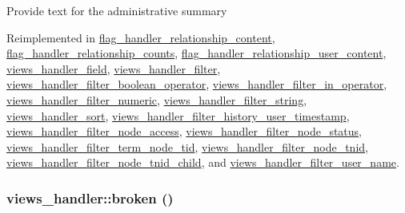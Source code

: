Provide text for the administrative summary 

Reimplemented in \hyperlink{classflag__handler__relationship__content_d5dd884b0fe1765d43a268baf16057ef}{flag\_\-handler\_\-relationship\_\-content}, \hyperlink{classflag__handler__relationship__counts_69a8b8c5c2a4ffa37f3cded6990716b2}{flag\_\-handler\_\-relationship\_\-counts}, \hyperlink{classflag__handler__relationship__user__content_4612285c2176c18f0bcc809531ab22ee}{flag\_\-handler\_\-relationship\_\-user\_\-content}, \hyperlink{classviews__handler__field_984d6ce9f6401260fca2d4673b27ae76}{views\_\-handler\_\-field}, \hyperlink{classviews__handler__filter_655263cd0b73188eec064b9a9743fe4c}{views\_\-handler\_\-filter}, \hyperlink{classviews__handler__filter__boolean__operator_7b58a9b58ae9778383b6a215834d7cdb}{views\_\-handler\_\-filter\_\-boolean\_\-operator}, \hyperlink{classviews__handler__filter__in__operator_2c17bde9b5cb3498d31786ba888d545c}{views\_\-handler\_\-filter\_\-in\_\-operator}, \hyperlink{classviews__handler__filter__numeric_aece85d3c36d4186c871cc55e636f4f2}{views\_\-handler\_\-filter\_\-numeric}, \hyperlink{classviews__handler__filter__string_3152b0f2ce38cf493327e2a91b9c9f5e}{views\_\-handler\_\-filter\_\-string}, \hyperlink{classviews__handler__sort_94271a6ce69bf4acb37047b01f0decaa}{views\_\-handler\_\-sort}, \hyperlink{classviews__handler__filter__history__user__timestamp_a5eeead15fcc3d6e74ca62c31676e109}{views\_\-handler\_\-filter\_\-history\_\-user\_\-timestamp}, \hyperlink{classviews__handler__filter__node__access_2f3abe4aa9418904e52937d1549fd560}{views\_\-handler\_\-filter\_\-node\_\-access}, \hyperlink{classviews__handler__filter__node__status_fad09e6f2c94d8f6748b48c3ce137a25}{views\_\-handler\_\-filter\_\-node\_\-status}, \hyperlink{classviews__handler__filter__term__node__tid_392046588b13b1b76223eb22ba4ff660}{views\_\-handler\_\-filter\_\-term\_\-node\_\-tid}, \hyperlink{classviews__handler__filter__node__tnid_037932cf19297e4b8544c24747509823}{views\_\-handler\_\-filter\_\-node\_\-tnid}, \hyperlink{classviews__handler__filter__node__tnid__child_3762760577c3801276a683271be90e47}{views\_\-handler\_\-filter\_\-node\_\-tnid\_\-child}, and \hyperlink{classviews__handler__filter__user__name_ba7659d0d6c937d9c346e8ed3af532b6}{views\_\-handler\_\-filter\_\-user\_\-name}.\hypertarget{classviews__handler_c1cd2ff30cb558c79cc908be516fb725}{
\subsubsection[{broken}]{\setlength{\rightskip}{0pt plus 5cm}views\_\-handler::broken ()}}
\label{classviews__handler_c1cd2ff30cb558c79cc908be516fb725}


